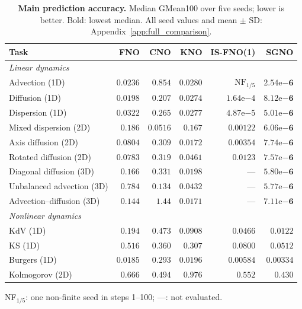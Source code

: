 \begin{table}[!b]
\centering
\caption{\textbf{Main prediction accuracy.} Median GMean100 over five seeds; lower is better. Bold: lowest median. All seed values and mean $\pm$ SD: Appendix~\ref{app:full_comparison}.}
\label{tab:main-comparison}
\begingroup\small
\setlength{\tabcolsep}{2.3pt}\renewcommand{\arraystretch}{1.14}
\begin{tabular*}{\linewidth}{@{\extracolsep{\fill}}lrrrrr@{}}
\toprule
Task & FNO & CNO & KNO & IS-FNO(1) & SGNO \\
\midrule
\multicolumn{6}{l}{\textit{Linear dynamics}} \\
Advection (1D) & $0.0236$ & $0.854$ & $0.0280$ & $\mathrm{NF}_{1/5}$ & $\mathbf{2.54\mathrm{e}{-6}}$ \\
Diffusion (1D) & $0.0198$ & $0.207$ & $0.0274$ & $1.64\mathrm{e}{-4}$ & $\mathbf{8.12\mathrm{e}{-6}}$ \\
Dispersion (1D) & $0.0322$ & $0.265$ & $0.0277$ & $4.87\mathrm{e}{-5}$ & $\mathbf{5.01\mathrm{e}{-6}}$ \\
Mixed dispersion (2D) & $0.186$ & $0.0516$ & $0.167$ & $0.00122$ & $\mathbf{6.06\mathrm{e}{-6}}$ \\
Axis diffusion (2D) & $0.0804$ & $0.309$ & $0.0172$ & $0.00354$ & $\mathbf{7.74\mathrm{e}{-6}}$ \\
Rotated diffusion (2D) & $0.0783$ & $0.319$ & $0.0461$ & $0.0123$ & $\mathbf{7.57\mathrm{e}{-6}}$ \\
Diagonal diffusion (3D) & $0.166$ & $0.331$ & $0.0198$ & --- & $\mathbf{5.80\mathrm{e}{-6}}$ \\
Unbalanced advection (3D) & $0.784$ & $0.134$ & $0.0432$ & --- & $\mathbf{5.77\mathrm{e}{-6}}$ \\
Advection--diffusion (3D) & $0.144$ & $1.44$ & $0.0171$ & --- & $\mathbf{7.11\mathrm{e}{-6}}$ \\
\midrule
\multicolumn{6}{l}{\textit{Nonlinear dynamics}} \\
KdV (1D) & $0.194$ & $0.473$ & $0.0908$ & $0.0466$ & $\mathbf{0.0122}$ \\
KS (1D) & $0.516$ & $0.360$ & $0.307$ & $0.0800$ & $\mathbf{0.0512}$ \\
Burgers (1D) & $0.0185$ & $0.293$ & $0.0196$ & $0.00584$ & $\mathbf{0.00334}$ \\
Kolmogorov (2D) & $0.666$ & $0.494$ & $0.976$ & $0.552$ & $\mathbf{0.430}$ \\
\bottomrule
\end{tabular*}\endgroup
\par\smallskip\begin{minipage}{\linewidth}\footnotesize
NF$_{1/5}$: one non-finite seed in steps 1--100; ---: not evaluated.
\end{minipage}
\end{table}
